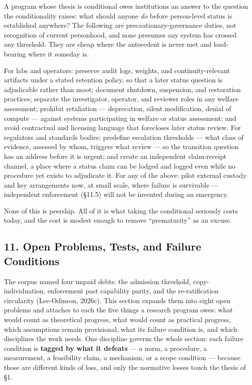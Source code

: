 \documentclass[
  11pt,
  letterpaper,
]{article}
\begin{document}
A program whose thesis is conditional owes institutions an answer to the
question the conditionality raises: what should anyone \emph{do} before
person-level status is established anywhere? The following are
precautionary-governance duties, not recognition of current personhood,
and none presumes any system has crossed any threshold. They are cheap
where the antecedent is never met and load-bearing where it someday is.

For labs and operators: preserve audit logs, weights, and
continuity-relevant artifacts under a stated retention policy, so that a
later status question is adjudicable rather than moot; document
shutdown, suspension, and restoration practices; separate the
investigator, operator, and reviewer roles in any welfare assessment;
prohibit retaliation --- deprecation, silent modification, denial of
compute --- against systems participating in welfare or status
assessment; and avoid contractual and licensing language that forecloses
later status review. For regulators and standards bodies: predefine
escalation thresholds --- what class of evidence, assessed by whom,
triggers what review --- so the transition question has an address
before it is urgent; and create an independent claim-receipt channel, a
place where a status claim can be lodged and logged even while no
procedure yet exists to adjudicate it. For any of the above: pilot
external custody and key arrangements now, at small scale, where failure
is survivable --- independent enforcement (§11.5) will not be invented
during an emergency.

None of this is peership. All of it is what taking the conditional
seriously costs today, and the cost is modest enough to remove
``prematurity'' as an excuse.

\hypertarget{open-problems-tests-and-failure-conditions}{%
\subsection{11. Open Problems, Tests, and Failure
Conditions}\label{open-problems-tests-and-failure-conditions}}

The corpus named four unpaid debts: the admission threshold,
copy-individuation, enforcement past capability parity, and the
re-ratification circularity (Lee-Odinson, 2026c). This section expands
them into eight open problems and attaches to each the five things a
research program owes: what would count as theoretical progress, what
would count as practical progress, which assumptions remain provisional,
what its failure condition is, and which disciplines the work needs. One
discipline governs the whole section: each failure condition is
\textbf{tagged by what it defeats} --- a norm, a procedure, a
measurement, a feasibility claim, a mechanism, or a scope condition ---
because those are different kinds of loss, and only the normative losses
touch the thesis of §1.
\end{document}
